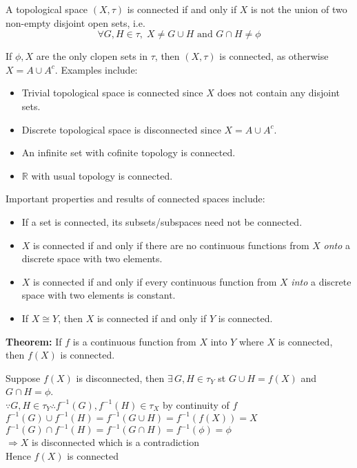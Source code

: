 \documentclass{article}
\begin{document}
A topological space $(X, \tau)$ is connected if and only if $X$ is not the union of two non-empty disjoint open sets, i.e. 
$$\forall G,H \in \tau, \; X \not= G \cup H \text{ and } G \cap H \not= \phi$$

If $\phi, X$ are the only clopen sets in $\tau$, then $(X, \tau)$ is connected, as otherwise $X = A \cup A^c$. Examples include:
\begin{itemize}
	\item Trivial topological space is connected since $X$ does not contain any disjoint sets.
	\item Discrete topological space is disconnected since $X = A \cup A^c$.
	\item An infinite set with cofinite topology is connected.
	\item $\mathbb{R}$ with usual topology is connected.
\end{itemize}

Important properties and results of connected spaces include:
\begin{itemize}
	\item If a set is connected, its subsets/subspaces need not be connected.
	\item $X$ is connected if and only if there are no continuous functions from $X$ \textit{onto} a discrete space with two elements.
	\item $X$ is connected if and only if every continuous function from $X$ \textit{into} a discrete space with two elements is constant.
	\item If $X \cong Y$, then $X$ is connected if and only if $Y$ is connected.
\end{itemize}

\textbf{Theorem:} If $f$ is a continuous function from $X$ into $Y$ where $X$ is connected, then $f(X)$ is connected.
\begin{tcolorbox}[colback=lightgray!10,colframe=lightgray!10, fontupper=\linespread{1.5}\selectfont]
	Suppose $f(X)$ is disconnected, then $\exists \, G,H \in \tau_Y$ st $G \cup H = f(X)$ and $G \cap H = \phi$. \\
	$\because G,H \in \tau_Y \therefore f^{-1}(G), f^{-1}(H) \in \tau_X$ by continuity of $f$ \\
	$f^{-1}(G) \cup f^{-1}(H) = f^{-1}(G \cup H) = f^{-1}(f(X)) = X$ \\
	$f^{-1}(G) \cap f^{-1}(H) = f^{-1}(G \cap H) = f^{-1}(\phi) = \phi$ \\
	$\Rightarrow X$ is disconnected which is a contradiction \\
	Hence $f(X)$ is connected
\end{tcolorbox}
\end{document}
